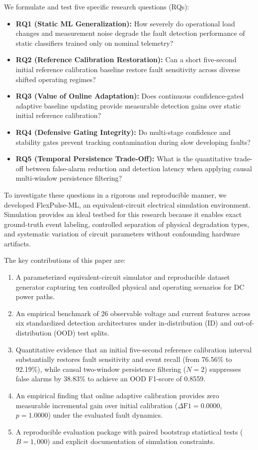 \documentclass[conference]{IEEEtran}
\begin{document}
We formulate and test five specific research questions (RQs):
\begin{itemize}
    \item \textbf{RQ1 (Static ML Generalization):} How severely do operational load changes and measurement noise degrade the fault detection performance of static classifiers trained only on nominal telemetry?
    \item \textbf{RQ2 (Reference Calibration Restoration):} Can a short five-second initial reference calibration baseline restore fault sensitivity across diverse shifted operating regimes?
    \item \textbf{RQ3 (Value of Online Adaptation):} Does continuous confidence-gated adaptive baseline updating provide measurable detection gains over static initial reference calibration?
    \item \textbf{RQ4 (Defensive Gating Integrity):} Do multi-stage confidence and stability gates prevent tracking contamination during slow developing faults?
    \item \textbf{RQ5 (Temporal Persistence Trade-Off):} What is the quantitative trade-off between false-alarm reduction and detection latency when applying causal multi-window persistence filtering?
\end{itemize}

To investigate these questions in a rigorous and reproducible manner, we developed FlexPulse-ML, an equivalent-circuit electrical simulation environment. Simulation provides an ideal testbed for this research because it enables exact ground-truth event labeling, controlled separation of physical degradation types, and systematic variation of circuit parameters without confounding hardware artifacts.

The key contributions of this paper are:
\begin{enumerate}
    \item A parameterized equivalent-circuit simulator and reproducible dataset generator capturing ten controlled physical and operating scenarios for DC power paths.
    \item An empirical benchmark of 26 observable voltage and current features across six standardized detection architectures under in-distribution (ID) and out-of-distribution (OOD) test splits.
    \item Quantitative evidence that an initial five-second reference calibration interval substantially restores fault sensitivity and event recall (from 76.56\% to 92.19\%), while causal two-window persistence filtering ($N=2$) suppresses false alarms by 38.83\% to achieve an OOD F1-score of 0.8559.
    \item An empirical finding that online adaptive calibration provides zero measurable incremental gain over initial calibration ($\Delta\text{F1} = 0.0000$, $p = 1.0000$) under the evaluated fault dynamics.
    \item A reproducible evaluation package with paired bootstrap statistical tests ($B=1,000$) and explicit documentation of simulation constraints.
\end{enumerate}
\end{document}
